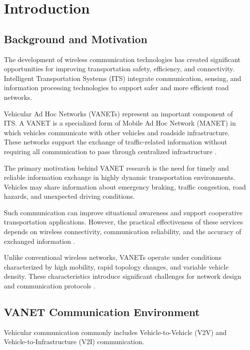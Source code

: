 
\section{Introduction}
\label{sec:1}

\subsection{Background and Motivation}

The development of wireless communication
technologies has created significant opportunities
for improving transportation safety, efficiency,
and connectivity. Intelligent Transportation
Systems (ITS) integrate communication, sensing,
and information processing technologies to
support safer and more efficient road networks.

Vehicular Ad Hoc Networks (VANETs) represent
an important component of ITS. A VANET is
a specialized form of Mobile Ad Hoc Network
(MANET) in which vehicles communicate with
other vehicles and roadside infrastructure.
These networks support the exchange of
traffic-related information without requiring
all communication to pass through centralized
infrastructure \cite{Hartenstein2008}.

The primary motivation behind VANET research
is the need for timely and reliable
information exchange in highly dynamic
transportation environments. Vehicles may
share information about emergency braking,
traffic congestion, road hazards, and
unexpected driving conditions.

Such communication can improve situational
awareness and support cooperative
transportation applications. However,
the practical effectiveness of these
services depends on wireless connectivity,
communication reliability, and the
accuracy of exchanged information
\cite{Zeadally2012}.

Unlike conventional wireless networks,
VANETs operate under conditions
characterized by high mobility,
rapid topology changes, and
variable vehicle density.
These characteristics introduce
significant challenges for
network design and communication
protocols \cite{Karagiannis2011}.

\subsection{VANET Communication Environment}

Vehicular communication commonly includes
Vehicle-to-Vehicle (V2V) and
Vehicle-to-Infrastructure (V2I) communication.

